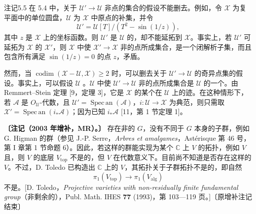 \begin{SGAresult}{注记}{5.5}
在 5.4 中，关于 $\mathcal U'\to\mathcal U$ 非点的集合的假设不能删去。例如，令 $\mathcal X$ 为复平面中的单位圆盘，$\mathcal U$ 为 $\mathcal X$ 中原点的补集，并令
\[
\mathcal U'=\mathcal U[T]/(T^2-\sin(1/z)),
\]
其中 $z$ 是 $\mathcal X$ 上的坐标函数。则 $\mathcal U'$ 是 $\mathcal U$ 的，却不能延拓到 $\mathcal X$。事实上，若 $\mathcal U'$ 可延拓为 $\mathcal X$ 的 $\mathcal X'$，则 $\mathcal X$ 中使 $\mathcal X'\to\mathcal X$ 非的点所成集合，是一个闭解析子集，而且包含所有满足 $\sin(1/z)=0$ 的点 $z$，矛盾。

然而，当 $\operatorname{codim}(\mathcal X-\mathcal U,\mathcal X)\geq2$ 时，可以删去关于 $\mathcal U'\to\mathcal U$ 的奇异点集的假设。事实上，可以假设 $\mathcal U$ 。$\mathcal U$ 中使 $\mathcal U'\to\mathcal U$ 非的点所成集合是 $\mathcal U$ 的一个。由 Remmert–Stein 定理 [9，定理 3]，它是 $\mathcal X$ 的某个在 $\mathcal U$ 上的迹。在这种情形下，若 $\mathcal A$ 是 $O_{\mathcal U}$-代数，且 $\mathcal U'=\operatorname{Spec\,an}(\mathcal A)$，$i:\mathcal U\to\mathcal X$ 为典范，则只需取 $\mathcal X'=\operatorname{Spec\,an}(i_*\mathcal A)$；因为已知 $i_*\mathcal A$  [11，第 1 节定理 1]。
\end{SGAresult}

\textbf{〔注记（2003 年增补，MR）。〕} 存在非的 $G$，没有不同于 $G$ 本身的子群，例如 G. Higman 的群（参见 J.-P. Serre，\textit{Arbres et amalgames}，Astérisque 第 46 号，第 I 章第 1 节命题 6）。因此，若这样的群能实现为某个 $\mathbb C$ 上 $V$ 的拓扑，例如 $V$ 且，则 $V$ 的底层 $V_{\mathrm{top}}$ 不是的，但 $V$ 在代数意义下。目前尚不知道是否存在这样的 $V$。不过，D. Toledo 已构造出 $\mathbb C$ 上的 $V$，其拓扑关于子群拓扑不是的，即自然
\[
\pi_1(V_{\mathrm{top}})\longrightarrow\pi_1(V_{\mathrm{alg}})
\]
不是。[D. Toledo，\textit{Projective varieties with non-residually finite fundamental group}（非剩余的），Publ. Math. IHES \textbf{77} (1993)，第 103—119 页。]〔原增补注记结束〕

